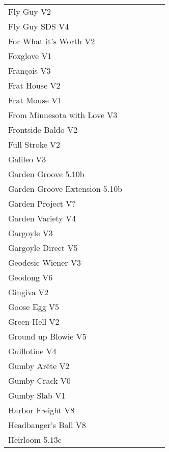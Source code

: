 \begin{flushleft}
\begin{center}
\begin{supertabular}{p{0.76\linewidth}p{0.08\linewidth}}
Fly Guy V2 & \pageref{rt:Fly Guy} \\
Fly Guy SDS V4 & \pageref{vr:Fly Guy SDS} \\
For What it's Worth V2 & \pageref{rt:For What it's Worth} \\
Foxglove V1 & \pageref{rt:Foxglove} \\
François V3 & \pageref{rt:François} \\
Frat House V2 & \pageref{rt:Frat House} \\
Frat Mouse V1 & \pageref{rt:Frat Mouse} \\
From Minnesota with Love V3 & \pageref{rt:From Minnesota with Love} \\
Frontside Baldo V2 & \pageref{rt:Frontside Baldo} \\
Full Stroke V2 & \pageref{rt:Full Stroke} \\
Galileo V3 & \pageref{rt:Galileo} \\
Garden Groove 5.10b & \pageref{rt:Garden Groove} \\
Garden Groove Extension 5.10b & \pageref{vr:Garden Groove Extension} \\
Garden Project V? & \pageref{rt:Garden Project} \\
Garden Variety V4 & \pageref{rt:Garden Variety} \\
Gargoyle V3 & \pageref{rt:Gargoyle} \\
Gargoyle Direct V5 & \pageref{vr:Gargoyle Direct} \\
Geodesic Wiener V3 & \pageref{rt:Geodesic Wiener} \\
Geodong V6 & \pageref{vr:Geodong} \\
Gingiva V2 & \pageref{rt:Gingiva} \\
Goose Egg V5 & \pageref{rt:Goose Egg} \\
Green Hell V2 & \pageref{rt:Green Hell} \\
Ground up Blowie V5 & \pageref{rt:Ground up Blowie} \\
Guillotine V4 & \pageref{rt:Guillotine} \\
Gumby Arête V2 & \pageref{rt:Gumby Arête} \\
Gumby Crack V0 & \pageref{rt:Gumby Crack} \\
Gumby Slab V1 & \pageref{rt:Gumby Slab} \\
Harbor Freight V8 & \pageref{vr:Harbor Freight} \\
Headbanger's Ball V8 & \pageref{rt:Hanging Prow Project} \\
Heirloom 5.13c & \pageref{rt:Heirloom} \\

\end{supertabular}
\end{center}
\end{flushleft}
